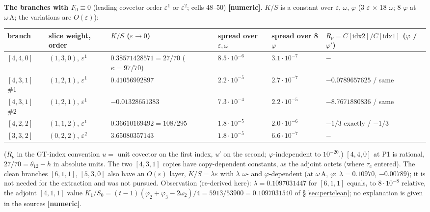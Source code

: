 \documentclass[10pt]{article}
\begin{document}
\textbf{The branches with $F_0\equiv0$} (leading covector order $\varepsilon^1$ or $\varepsilon^2$; cells 48--50) \textbf{[numeric]}. $K/S$ is a constant over $\varepsilon$, $\omega$, $\varphi$ (3 $\varepsilon$ $\times$ 18 $\omega$; 8 $\varphi$ at $\omega\,\mathrm{A}$; the variations are $O(\varepsilon)$):

\begin{center}\footnotesize\setlength{\tabcolsep}{3pt}\begin{longtable}{@{}p{1.5cm}p{2.0cm}p{3.9cm}p{1.9cm}p{1.9cm}p{3.0cm}@{}}\toprule
\textbf{branch} & \textbf{slice weight, order} & \textbf{$K/S$ ($\varepsilon\to0$)} & \textbf{spread over $\varepsilon,\omega$} & \textbf{spread over 8 $\varphi$} & \textbf{$R_\nu=C[\mathrm{idx}2]/C[\mathrm{idx}1]$ ($\varphi$ / $\varphi'$)} \\\midrule\endhead
$[4,4,0]$ & $(1,3,0)$, $\varepsilon^1$ & $0.38571428571=27/70$ ($\kappa=97/70$) & $8.5\cdot10^{-6}$ & $3.1\cdot10^{-7}$ & $-$ \\
$[4,3,1]$ \#1 & $(1,2,1)$, $\varepsilon^1$ & $0.41056992897$ & $2.2\cdot10^{-5}$ & $2.7\cdot10^{-7}$ & $-0.0789657625$ / same \\
$[4,3,1]$ \#2 & $(1,2,1)$, $\varepsilon^1$ & $-0.01328651383$ & $7.3\cdot10^{-4}$ & $2.2\cdot10^{-5}$ & $-8.7671880836$ / same \\
$[4,2,2]$ & $(1,1,2)$, $\varepsilon^1$ & $0.36610169492=108/295$ & $1.8\cdot10^{-5}$ & $2.0\cdot10^{-6}$ & $-1/3$ exactly / $-1/3$ \\
$[3,3,2]$ & $(0,2,2)$, $\varepsilon^2$ & $3.65080357143$ & $1.8\cdot10^{-5}$ & $6.6\cdot10^{-7}$ & $-$ \\
\bottomrule\end{longtable}\end{center}

($R_\nu$ in the GT-index convention $u=$ unit covector on the first index, $u'$ on the second; $\varphi$-independent to $10^{-20}$.) $[4,4,0]$ at P1 is rational, $27/70=\theta_{12}-h$ in absolute units. The two $[4,3,1]$ copies have copy-dependent constants, as the adjoint octets (where $\tau_c$ entered). The clean branches $[6,1,1]$, $[5,3,0]$ also have an $O(\varepsilon)$ layer, $K/S=\lambda\varepsilon$ with $\lambda$ $\omega$- and $\varphi$-dependent (at $\omega\,\mathrm{A}$, $\varphi$: $\lambda=0.10970$, $-0.00789$); it is not needed for the extraction and was not pursued. Observation (re-derived here): $\lambda=0.1097031447$ for $[6,1,1]$ equals, to $8\cdot10^{-8}$ relative, the adjoint $[4,1,1]$ value $K_1/S_0=(t-1)(\varphi_2+\varphi_3-2\omega_2)/4=5913/53900=0.1097031540$ of \S\,\ref{sec:pertclean}; no explanation is given in the sources \textbf{[numeric]}.
\end{document}
